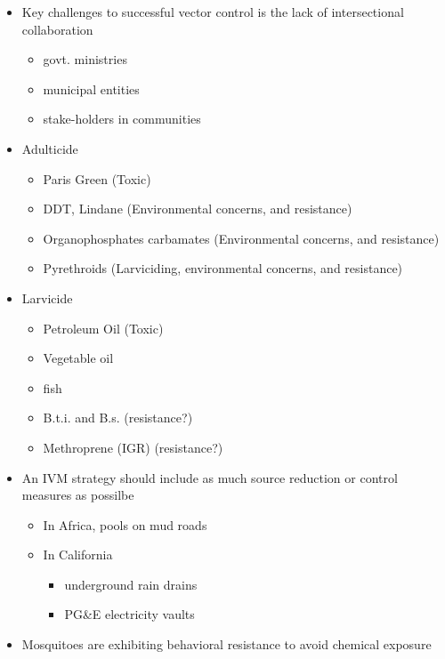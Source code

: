 \documentclass{article}
\begin{document}
\begin{itemize}
\begin{itemize}
\begin{itemize}
            \end{itemize}
        \end{itemize}
        \item Key challenges to successful vector control is the lack of intersectional collaboration
        \begin{itemize}
            \item govt. ministries
            \item municipal entities
            \item stake-holders in communities
        \end{itemize}
        \item Adulticide
        \begin{itemize}
            \item Paris Green (Toxic)
            \item DDT, Lindane (Environmental concerns, and resistance)
            \item Organophosphates carbamates (Environmental concerns, and resistance)
            \item Pyrethroids (Larviciding, environmental concerns, and resistance)
        \end{itemize}
        \item Larvicide
        \begin{itemize}
            \item Petroleum Oil (Toxic)
            \item Vegetable oil
            \item fish
            \item B.t.i. and B.s. (resistance?)
            \item Methroprene (IGR) (resistance?)
        \end{itemize}
        \item An IVM strategy should include as much source reduction or control measures as possilbe
        \begin{itemize}
            \item In Africa, pools on mud roads
            \item In California
            \begin{itemize}
                \item underground rain drains
                \item PG\&E electricity vaults
            \end{itemize}
        \end{itemize}
        \item Mosquitoes are exhibiting behavioral resistance to avoid chemical exposure

\end{itemize}
\end{document}
